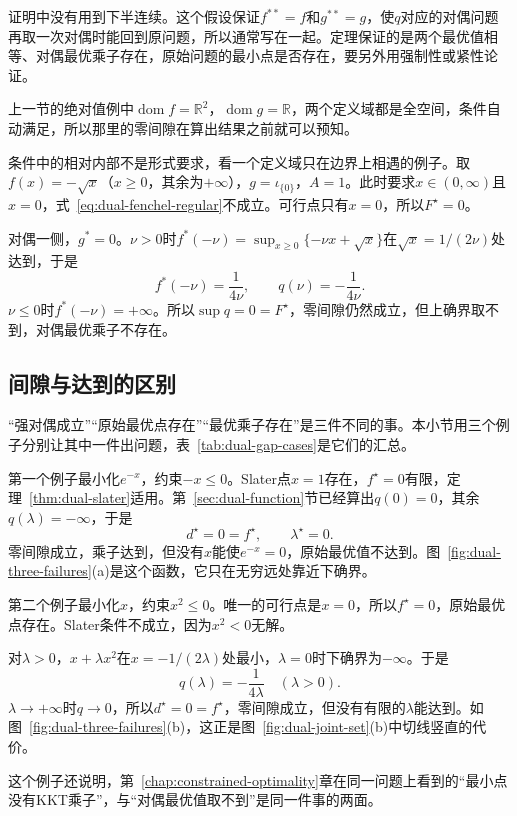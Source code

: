 证明中没有用到下半连续。这个假设保证$f^{**}=f$和$g^{**}=g$，使$q$对应的对偶问题再取一次对偶时能回到原问题，所以通常写在一起。定理保证的是两个最优值相等、对偶最优乘子存在，原始问题的最小点是否存在，要另外用强制性或紧性论证。

上一节的绝对值例中$\operatorname{dom}f=\mathbb{R}^2$，$\operatorname{dom}g=\mathbb{R}$，两个定义域都是全空间，条件自动满足，所以那里的零间隙在算出结果之前就可以预知。

条件中的相对内部不是形式要求，看一个定义域只在边界上相遇的例子。取$f(x)=-\sqrt{x}$（$x\geq0$，其余为$+\infty$），$g=\iota_{\{0\}}$，$A=1$。此时要求$x\in(0,\infty)$且$x=0$，式~\eqref{eq:dual-fenchel-regular}不成立。可行点只有$x=0$，所以$F^\star=0$。

对偶一侧，$g^*=0$。$\nu>0$时$f^*(-\nu)=\sup_{x\geq0}\{-\nu x+\sqrt{x}\}$在$\sqrt{x}=1/(2\nu)$处达到，于是
\[
 f^*(-\nu)=\frac{1}{4\nu},\qquad q(\nu)=-\frac{1}{4\nu}.
\]
$\nu\leq0$时$f^*(-\nu)=+\infty$。所以$\sup q=0=F^\star$，零间隙仍然成立，但上确界取不到，对偶最优乘子不存在。

\subsection{间隙与达到的区别}
\label{sec:dual-gap-attainment}

“强对偶成立”“原始最优点存在”“最优乘子存在”是三件不同的事。本小节用三个例子分别让其中一件出问题，表~\ref{tab:dual-gap-cases}是它们的汇总。

第一个例子最小化$e^{-x}$，约束$-x\leq0$。Slater点$x=1$存在，$f^\star=0$有限，定理~\ref{thm:dual-slater}适用。第~\ref{sec:dual-function}节已经算出$q(0)=0$，其余$q(\lambda)=-\infty$，于是
\[
 d^\star=0=f^\star,\qquad\lambda^\star=0.
\]
零间隙成立，乘子达到，但没有$x$能使$e^{-x}=0$，原始最优值不达到。图~\ref{fig:dual-three-failures}(a)是这个函数，它只在无穷远处靠近下确界。

第二个例子最小化$x$，约束$x^2\leq0$。唯一的可行点是$x=0$，所以$f^\star=0$，原始最优点存在。Slater条件不成立，因为$x^2<0$无解。

对$\lambda>0$，$x+\lambda x^2$在$x=-1/(2\lambda)$处最小，$\lambda=0$时下确界为$-\infty$。于是
\[
 q(\lambda)=-\frac{1}{4\lambda}\quad(\lambda>0).
\]
$\lambda\to+\infty$时$q\to0$，所以$d^\star=0=f^\star$，零间隙成立，但没有有限的$\lambda$能达到。如图~\ref{fig:dual-three-failures}(b)，这正是图~\ref{fig:dual-joint-set}(b)中切线竖直的代价。

这个例子还说明，第~\ref{chap:constrained-optimality}章在同一问题上看到的“最小点没有KKT乘子”，与“对偶最优值取不到”是同一件事的两面。

